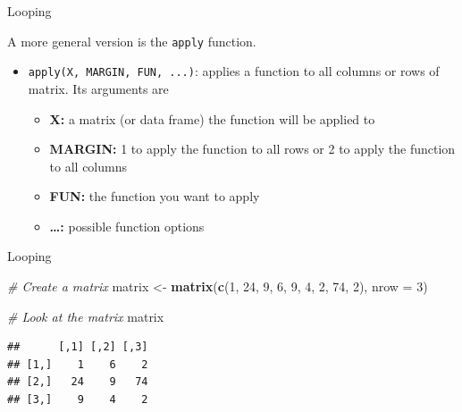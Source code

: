 \documentclass[ignorenonframetext,]{beamer}
\newenvironment{Shaded}{\begin{snugshade}}{\end{snugshade}}
\newcommand{\KeywordTok}[1]{\textcolor[rgb]{0.13,0.29,0.53}{\textbf{#1}}}
\newcommand{\DataTypeTok}[1]{\textcolor[rgb]{0.13,0.29,0.53}{#1}}
\newcommand{\DecValTok}[1]{\textcolor[rgb]{0.00,0.00,0.81}{#1}}
\newcommand{\StringTok}[1]{\textcolor[rgb]{0.31,0.60,0.02}{#1}}
\newcommand{\CommentTok}[1]{\textcolor[rgb]{0.56,0.35,0.01}{\textit{#1}}}
\newcommand{\NormalTok}[1]{#1}
\providecommand{\tightlist}{%
  \setlength{\itemsep}{0pt}\setlength{\parskip}{0pt}}
\begin{document}
\begin{frame}[fragile]{Looping}

A more general version is the \texttt{apply} function.

\begin{itemize}
\tightlist
\item
  \texttt{apply(X,\ MARGIN,\ FUN,\ ...)}: applies a function to all
  columns or rows of matrix. Its arguments are

  \begin{itemize}
  \tightlist
  \item
    \textbf{X:} a matrix (or data frame) the function will be applied to
  \item
    \textbf{MARGIN:} 1 to apply the function to all rows or 2 to apply
    the function to all columns
  \item
    \textbf{FUN:} the function you want to apply
  \item
    \textbf{\ldots{}:} possible function options
  \end{itemize}
\end{itemize}

\end{frame}

\begin{frame}[fragile]{Looping}

\begin{Shaded}
\begin{Highlighting}[]
    \CommentTok{# Create a matrix}
\NormalTok{    matrix <-}\StringTok{ }\KeywordTok{matrix}\NormalTok{(}\KeywordTok{c}\NormalTok{(}\DecValTok{1}\NormalTok{, }\DecValTok{24}\NormalTok{, }\DecValTok{9}\NormalTok{, }\DecValTok{6}\NormalTok{, }\DecValTok{9}\NormalTok{, }\DecValTok{4}\NormalTok{, }\DecValTok{2}\NormalTok{, }\DecValTok{74}\NormalTok{, }\DecValTok{2}\NormalTok{),}
                       \DataTypeTok{nrow =} \DecValTok{3}\NormalTok{)}

    \CommentTok{# Look at the matrix}
\NormalTok{    matrix}
\end{Highlighting}
\end{Shaded}

\begin{verbatim}
##      [,1] [,2] [,3]
## [1,]    1    6    2
## [2,]   24    9   74
## [3,]    9    4    2
\end{verbatim}

\end{frame}
\end{document}
